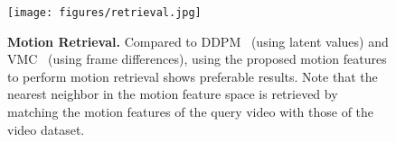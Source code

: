 \begin{figure}[t]
  \centering
  \texttt{[image: figures/retrieval.jpg]}
  \caption{{\bf Motion Retrieval.} Compared to DDPM~\cite{ddpm} (using latent values) and VMC~\cite{vmc} (using frame differences), using the proposed motion features to perform motion retrieval shows preferable results. Note that the nearest neighbor in the motion feature space is retrieved by matching the motion features of the query video with those of the video dataset.}
  \label{fig:retrieval}
\end{figure}